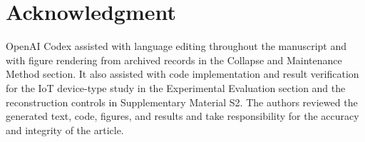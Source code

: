 \documentclass[journal]{IEEEtran}
\begin{document}
\section*{Acknowledgment}
OpenAI Codex assisted with language editing throughout the manuscript and with figure rendering from archived records in the Collapse and Maintenance Method section. It also assisted with code implementation and result verification for the IoT device-type study in the Experimental Evaluation section and the reconstruction controls in Supplementary Material S2. The authors reviewed the generated text, code, figures, and results and take responsibility for the accuracy and integrity of the article.



\end{document}

